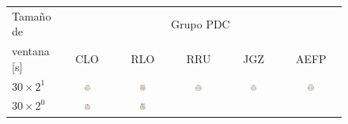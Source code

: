\begin{figure}
\centering
{\small
\begin{tabular}{lccccc}
\toprule
{ Tamaño de} & \multicolumn{5}{c}{Grupo PDC} \\
    \cmidrule{2-6}
{ ventana [s]}    & CLO & RLO & RRU & JGZ & AEFP \\
\midrule
$30 \times 2^1$ &
\includegraphics[width=0.13\textwidth]{./img_art_dfa/cabeza_new_CLO_60.pdf} &
\includegraphics[width=0.13\textwidth]{./img_art_dfa/cabeza_new_RLO_60.pdf} &
\includegraphics[width=0.13\textwidth]{./img_art_dfa/cabeza_new_RRU_60.pdf} &
\includegraphics[width=0.13\textwidth]{./img_art_dfa/cabeza_new_JGZ_60.pdf} &
\includegraphics[width=0.13\textwidth]{./img_art_dfa/cabeza_new_AEFP_60.pdf} \\
\midrule
$30 \times 2^0$ &
\includegraphics[width=0.13\textwidth]{./img_art_dfa/cabeza_new_CLO_30.pdf} &
\includegraphics[width=0.13\textwidth]{./img_art_dfa/cabeza_new_RLO_30.pdf} &

\end{tabular}}
\end{figure}
